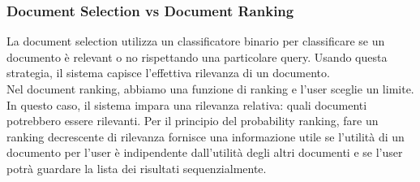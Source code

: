 \subsubsection{Document Selection vs Document Ranking}
La document selection utilizza un classificatore binario per classificare se un documento è relevant o no rispettando una particolare query. Usando questa strategia, il sistema capisce l'effettiva rilevanza di un documento. 
\\
Nel document ranking, abbiamo una funzione di ranking e l'user sceglie un limite. In questo caso, il sistema impara una rilevanza relativa: quali documenti potrebbero essere rilevanti. Per il principio del probability ranking, fare un ranking decrescente di rilevanza fornisce una informazione utile se l'utilità di un documento per l'user è indipendente dall'utilità degli altri documenti e se l'user potrà guardare la lista dei risultati sequenzialmente.

